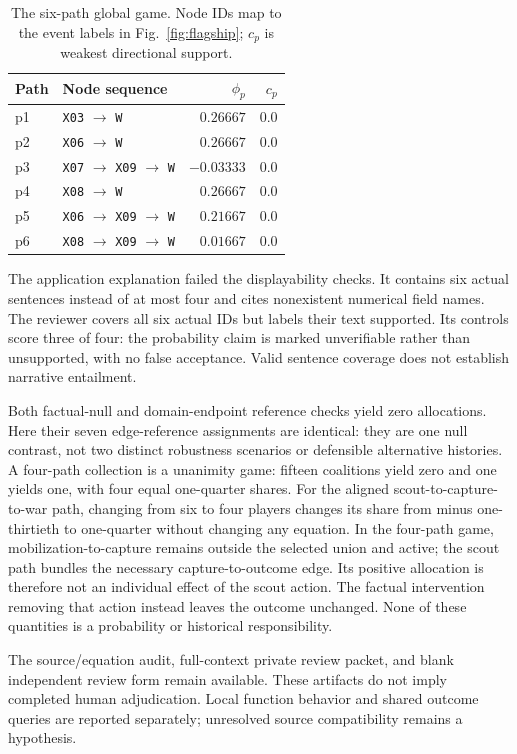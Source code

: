 \begin{table}[t]\centering\small\setlength{\tabcolsep}{5pt}
\caption{The six-path global game. Node IDs map to the event labels in Fig.~\ref{fig:flagship}; $c_p$ is weakest directional support.}\label{tab:applicationpaths}
\begin{tabular}{llrr}\toprule Path & Node sequence & $\phi_p$ & $c_p$\\\midrule
p1 & \texttt{X03} $\to$ \texttt{W} & $0.26667$ & 0.0\\
p2 & \texttt{X06} $\to$ \texttt{W} & $0.26667$ & 0.0\\
p3 & \texttt{X07} $\to$ \texttt{X09} $\to$ \texttt{W} & $-0.03333$ & 0.0\\
p4 & \texttt{X08} $\to$ \texttt{W} & $0.26667$ & 0.0\\
p5 & \texttt{X06} $\to$ \texttt{X09} $\to$ \texttt{W} & $0.21667$ & 0.0\\
p6 & \texttt{X08} $\to$ \texttt{X09} $\to$ \texttt{W} & $0.01667$ & 0.0\\
\bottomrule\end{tabular}\end{table}

The application explanation failed the displayability checks. It contains six actual sentences instead of at most four and cites nonexistent numerical field names. The reviewer covers all six actual IDs but labels their text supported. Its controls score three of four: the probability claim is marked unverifiable rather than unsupported, with no false acceptance. Valid sentence coverage does not establish narrative entailment.

Both factual-null and domain-endpoint reference checks yield zero allocations. Here their seven edge-reference assignments are identical: they are one null contrast, not two distinct robustness scenarios or defensible alternative histories. A four-path collection is a unanimity game: fifteen coalitions yield zero and one yields one, with four equal one-quarter shares. For the aligned scout-to-capture-to-war path, changing from six to four players changes its share from minus one-thirtieth to one-quarter without changing any equation. In the four-path game, mobilization-to-capture remains outside the selected union and active; the scout path bundles the necessary capture-to-outcome edge. Its positive allocation is therefore not an individual effect of the scout action. The factual intervention removing that action instead leaves the outcome unchanged. None of these quantities is a probability or historical responsibility.

The source/equation audit, full-context private review packet, and blank independent review form remain available. These artifacts do not imply completed human adjudication. Local function behavior and shared outcome queries are reported separately; unresolved source compatibility remains a hypothesis.
